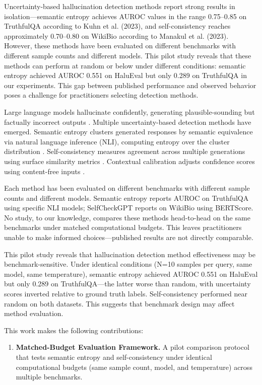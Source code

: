 
Uncertainty-based hallucination detection methods report strong results in isolation---semantic entropy achieves AUROC values in the range 0.75--0.85 on TruthfulQA according to Kuhn et al. (2023), and self-consistency reaches approximately 0.70--0.80 on WikiBio according to Manakul et al. (2023). However, these methods have been evaluated on different benchmarks with different sample counts and different models. This pilot study reveals that these methods can perform at random or below under different conditions: semantic entropy achieved AUROC 0.551 on HaluEval but only 0.289 on TruthfulQA in our experiments. This gap between published performance and observed behavior poses a challenge for practitioners selecting detection methods.

Large language models hallucinate confidently, generating plausible-sounding but factually incorrect outputs \citep{lin2022truthfulqa}. Multiple uncertainty-based detection methods have emerged. Semantic entropy clusters generated responses by semantic equivalence via natural language inference (NLI), computing entropy over the cluster distribution \citep{kuhn2023semantic}. Self-consistency measures agreement across multiple generations using surface similarity metrics \citep{manakul2023selfcheckgpt}. Contextual calibration adjusts confidence scores using content-free inputs \citep{zhao2021calibrate}.

Each method has been evaluated on different benchmarks with different sample counts and different models. Semantic entropy reports AUROC on TruthfulQA using specific NLI models; SelfCheckGPT reports on WikiBio using BERTScore. No study, to our knowledge, compares these methods head-to-head on the same benchmarks under matched computational budgets. This leaves practitioners unable to make informed choices---published results are not directly comparable.

This pilot study reveals that hallucination detection method effectiveness may be benchmark-sensitive. Under identical conditions (N=10 samples per query, same model, same temperature), semantic entropy achieved AUROC 0.551 on HaluEval but only 0.289 on TruthfulQA---the latter worse than random, with uncertainty scores inverted relative to ground truth labels. Self-consistency performed near random on both datasets. This suggests that benchmark design may affect method evaluation.

This work makes the following contributions:

\begin{enumerate}
\item \textbf{Matched-Budget Evaluation Framework.} A pilot comparison protocol that tests semantic entropy and self-consistency under identical computational budgets (same sample count, model, and temperature) across multiple benchmarks.
\end{enumerate}

